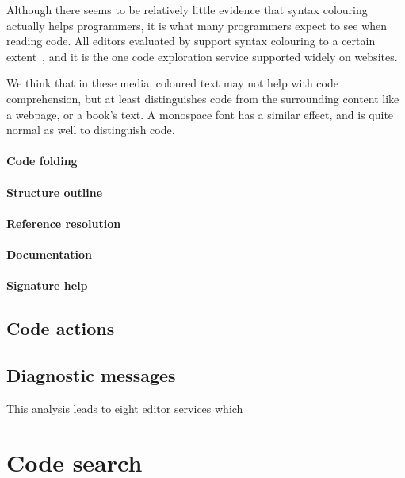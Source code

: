 Although there seems to be relatively little evidence that syntax colouring actually helps programmers,
it is what many programmers expect to see when reading code.
All editors evaluated by \citeauthor{Pelsmaeker2018} support syntax colouring to a certain extent~\autocite{Pelsmaeker2018},
and it is the one code exploration service supported widely on websites.

We think that in these media, coloured text may not help with code comprehension, but at least
distinguishes code from the surrounding content like a webpage, or a book's text.
A monospace font has a similar effect, and is quite normal as well to distinguish code.

\paragraph{Code folding}

\paragraph{Structure outline}

\paragraph{Reference resolution}

\paragraph{Documentation}

\paragraph{Signature help}

\subsection*{Code actions}

\subsection*{Diagnostic messages}

This analysis leads to eight editor services which

\section{Code search}\label{sec:code-search}

